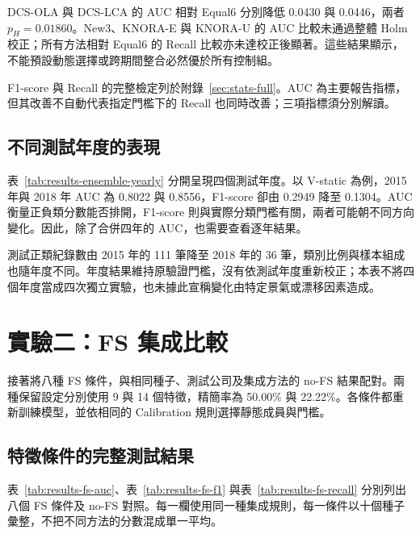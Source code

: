DCS-OLA 與 DCS-LCA 的 AUC 相對 Equal6 分別降低 0.0430 與 0.0446，兩者 \(p_H=0.01860\)。New3、KNORA-E 與 KNORA-U 的 AUC 比較未通過整體 Holm 校正；所有方法相對 Equal6 的 Recall 比較亦未達校正後顯著。這些結果顯示，不能預設動態選擇或跨期間整合必然優於所有控制組。

F1-score 與 Recall 的完整檢定列於附錄~\ref{sec:stats-full}。AUC 為主要報告指標，但其改善不自動代表指定門檻下的 Recall 也同時改善；三項指標須分別解讀。

\subsection{不同測試年度的表現}



表~\ref{tab:results-ensemble-yearly} 分開呈現四個測試年度。以 V-static 為例，2015 年與 2018 年 AUC 為 0.8022 與 0.8556，F1-score 卻由 0.2949 降至 0.1304。AUC 衡量正負類分數能否排開，F1-score 則與實際分類門檻有關，兩者可能朝不同方向變化。因此，除了合併四年的 AUC，也需要查看逐年結果。

測試正類紀錄數由 2015 年的 111 筆降至 2018 年的 36 筆，類別比例與樣本組成也隨年度不同。年度結果維持原驗證門檻，沒有依測試年度重新校正；本表不將四個年度當成四次獨立實驗，也未據此宣稱變化由特定景氣或漂移因素造成。

\section{實驗二：FS 集成比較}\label{sec:results-experiment2}

接著將八種 FS 條件，與相同種子、測試公司及集成方法的 no-FS 結果配對。兩種保留設定分別使用 9 與 14 個特徵，精簡率為 50.00\% 與 22.22\%。各條件都重新訓練模型，並依相同的 Calibration 規則選擇靜態成員與門檻。

\subsection{特徵條件的完整測試結果}

表~\ref{tab:results-fs-auc}、表~\ref{tab:results-fs-f1} 與表~\ref{tab:results-fs-recall} 分別列出八個 FS 條件及 no-FS 對照。每一欄使用同一種集成規則，每一條件以十個種子彙整，不把不同方法的分數混成單一平均。





